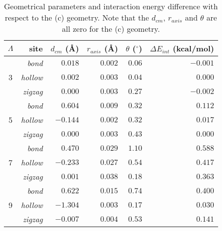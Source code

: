 \def\btab#1#2{\expandafter\gdef\csname tab-#1\endcsname{\begin{table}[ht]#2\label{#1}\end{table}}}
\def\tref#1{\csname tab-#1\endcsname\Cref{#1}}

\btab{tab:geom_comp}{
    \centering
    \begin{tabular}{crrrrr}
        \toprule
        \textit{$\Lambda$} & site & $d_{cm}$ (\AA) & $r_{axis}$ (\AA) & $\theta$ ($^{\circ}$) & $\Delta E_{int}$ (kcal/mol) \\
        \midrule
        \multirow{3}{*}{3} & \textit{bond} & $ 0.018$ & $ 0.002$ & $0.06$ & $-0.001$ \\
        ~ & \textit{hollow}                & $ 0.002$ & $ 0.003$ & $0.04$ & $ 0.000$ \\
        ~ & \textit{zigzag}                & $ 0.000$ & $ 0.003$ & $0.27$ & $-0.002$ \\
        \midrule
        \multirow{3}{*}{5} & \textit{bond} & $ 0.604$ & $ 0.009$ & $0.32$ & $ 0.112$ \\
        ~ & \textit{hollow}                & $-0.144$ & $ 0.002$ & $0.32$ & $ 0.017$ \\
        ~ & \textit{zigzag}                & $ 0.000$ & $ 0.003$ & $0.43$ & $ 0.000$ \\
        \midrule
        \multirow{3}{*}{7} & \textit{bond} & $ 0.470$ & $ 0.029$ & $1.10$ & $ 0.588$ \\
        ~ & \textit{hollow}                & $-0.233$ & $ 0.027$ & $0.54$ & $ 0.417$ \\
        ~ & \textit{zigzag}                & $ 0.001$ & $ 0.038$ & $0.18$ & $ 0.363$ \\
        \midrule
        \multirow{3}{*}{9} & \textit{bond} & $ 0.622$ & $ 0.015$ & $0.74$ & $ 0.400$ \\
        ~ & \textit{hollow}                & $-1.304$ & $ 0.003$ & $0.17$ & $ 0.030$ \\
        ~ & \textit{zigzag}                & $-0.007$ & $ 0.004$ & $0.53$ & $ 0.141$ \\
        \bottomrule
    \end{tabular}
    \caption{Geometrical parameters and interaction energy difference with respect to the (c) geometry. Note that the $d_{cm}$, $r_{axis}$ and $\theta$ are all zero for the (c) geometry.}
}

